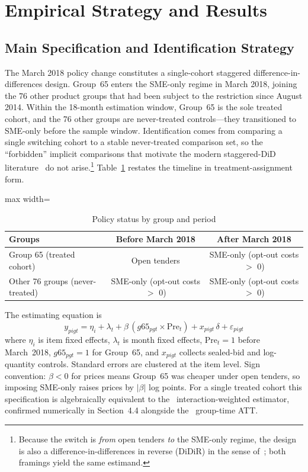 \section{Empirical Strategy and Results}

\subsection{Main Specification and Identification Strategy}
The March 2018 policy change constitutes a single-cohort staggered difference-in-differences design. Group~65 enters the SME-only regime in March 2018, joining the 76 other product groups that had been subject to the restriction since August 2014. Within the 18-month estimation window, Group~65 is the sole treated cohort, and the 76 other groups are never-treated controls---they transitioned to SME-only before the sample window. Identification comes from comparing a single switching cohort to a stable never-treated comparison set, so the ``forbidden'' implicit comparisons that motivate the modern staggered-DiD literature~\citep{callaway2021,sun2021,goodmanbacon2021,borusyak2024,dechaisemartin2020,roth2023} do not arise.\footnote{Because the switch is \emph{from} open tenders \emph{to} the SME-only regime, the design is also a difference-in-differences in reverse (DiDiR) in the sense of~\citet{kim2019}; both framings yield the same estimand.} Table~\ref{tab:groups} restates the timeline in treatment-assignment form.

\begin{table}[htbp]
\centering
\caption{Policy status by group and period}
\label{tab:groups}
\begin{adjustbox}{max width=\textwidth}
\begin{tabular}{lcc}
\toprule
Groups & Before March 2018 & After March 2018 \\
\midrule
Group 65 (treated cohort)        & Open tenders         & SME-only (opt-out costs $>$ 0) \\
Other 76 groups (never-treated)  & SME-only (opt-out costs $>$ 0) & SME-only (opt-out costs $>$ 0) \\
\bottomrule
\end{tabular}
\end{adjustbox}
\end{table}

The estimating equation is
\begin{equation}
y_{pigt} = \eta_i + \lambda_t + \beta\,(g65_{pgt}\times \text{Pre}_t) + x_{pigt}\,\delta + \varepsilon_{pigt}
\label{eq:did}
\end{equation}
where $\eta_i$ is item fixed effects, $\lambda_t$ is month fixed effects, $\text{Pre}_t=1$ before March~2018, $g65_{pgt}=1$ for Group~65, and $x_{pigt}$ collects sealed-bid and log-quantity controls. Standard errors are clustered at the item level. Sign convention: $\beta<0$ for prices means Group~65 was cheaper under open tenders, so imposing SME-only raises prices by $|\beta|$ log points. For a single treated cohort this specification is algebraically equivalent to the~\citet{sun2021} interaction-weighted estimator, confirmed numerically in Section~4.4 alongside the~\citet{callaway2021} group-time ATT.

